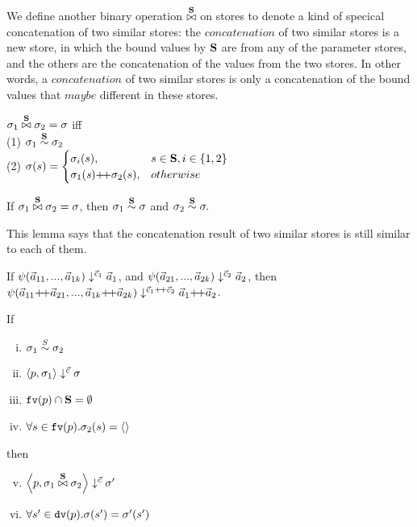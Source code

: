 We define another binary operation $\x\S$ on stores to denote a kind of specical concatenation of two similar stores: 
the $concatenation$ of two similar stores is a new store, in which the bound values by $\S$ are from any of the parameter stores, and 
the others are the concatenation of the values from the two stores. 
In other words, a $concatenation$ of two similar stores is only a concatenation of the bound values that $maybe$ different in these stores.
\begin{defi}
	\label{def-sgm-join}
	$\sgm_1 \x{\S} \sgm_2 = \sgm$ iff \\
	(1) $\sgm_1 \~{\S} \sgm_2$  \\
	(2) $\sgm(s) =
	\begin{cases}
	\sgm_i(s),& s \in \S, i \in \{1,2\}\\
	\sgm_1(\s) {\++} \sgm_2(s), & otherwise \\
	\end{cases} $
\end{defi}

\begin{lem} \label{lem-join1}
	If $\sgm_1 \x{\S} \sgm_2 = \sgm$, 
	then $\sgm_1 \~{\S} \sgm$ and $\sgm_2 \~{\S} \sgm.$
\end{lem}
This lemma says that the concatenation result of two similar stores is still similar to each of them.


\begin{lem} \label{lem-psi-join}
	If $\sevalfg{\lcall}{\a_{11},...,\a_{1k}}{\c_1}{\a_1}$,
	and $\sevalfg{\lcall}{\a_{21},...,\a_{2k}}{\c_2}{\a_2}$,
	then $\sevalfg{\lcall}{\a_{11} {\++} \a_{21},...,\a_{1k} {\++} \a_{2k}}{\c_1 {\++} \c_2}{\a_1 {\++} \a_2}$.
\end{lem}


\begin{lem} \label{lem-emp-join}
	If 
	\begin{enumerate} [(i)]
		\item $\sgm_1 \~{S} \sgm_2$
		\item $\seval{p}{\sgm_1}{\c}{\sgm}$
		\item $\FV{p} \cap \S = \emptyset$
		\item $\forall s \in \FV{p}. \sgm_2(s) = \emptyv$
	\end{enumerate}
	then 
	\begin{enumerate}[(i)]
		\setcounter{enumi}{4}
		\item $\seval{p}{\sgm_1 \x{\S} \sgm_2}{\c}{\sgm'}$
		\item $\forall s' \in \dv{p}. \sgm(s') = \sgm'(s')$
	\end{enumerate}
\end{lem}

